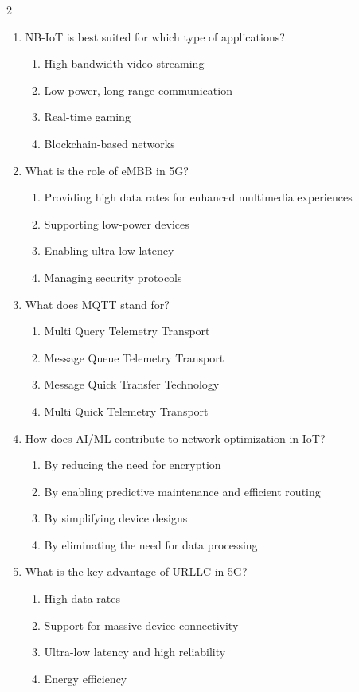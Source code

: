 \begin{multicols}{2}
\begin{enumerate}
    \item NB-IoT is best suited for which type of applications?
    \begin{enumerate}
        \item High-bandwidth video streaming
        \item Low-power, long-range communication
        \item Real-time gaming
        \item Blockchain-based networks
    \end{enumerate}

    \item What is the role of eMBB in 5G?
    \begin{enumerate}
        \item Providing high data rates for enhanced multimedia experiences
        \item Supporting low-power devices
        \item Enabling ultra-low latency
        \item Managing security protocols
    \end{enumerate}

    \item What does MQTT stand for?
    \begin{enumerate}
        \item Multi Query Telemetry Transport
        \item Message Queue Telemetry Transport
        \item Message Quick Transfer Technology
        \item Multi Quick Telemetry Transport
    \end{enumerate}

    \newpage
    \item How does AI/ML contribute to network optimization in IoT?
    \begin{enumerate}
        \item By reducing the need for encryption
        \item By enabling predictive maintenance and efficient routing
        \item By simplifying device designs
        \item By eliminating the need for data processing
    \end{enumerate}

    \item What is the key advantage of URLLC in 5G?
    \begin{enumerate}
        \item High data rates
        \item Support for massive device connectivity
        \item Ultra-low latency and high reliability
        \item Energy efficiency
    \end{enumerate}
    

\end{enumerate}
\end{multicols}
